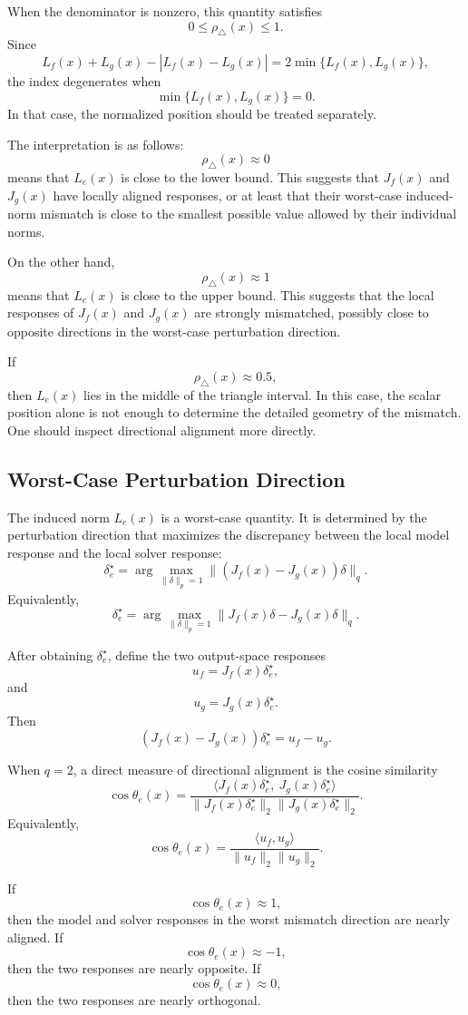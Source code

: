 \documentclass{article}
\begin{document}
When the denominator is nonzero, this quantity satisfies
\[
0\le \rho_{\triangle}(x)\le 1.
\]
Since
\[
L_f(x)+L_g(x)-|L_f(x)-L_g(x)|
=
2\min\{L_f(x),L_g(x)\},
\]
the index degenerates when
\[
\min\{L_f(x),L_g(x)\}=0.
\]
In that case, the normalized position should be treated separately.

The interpretation is as follows:
\[
\rho_{\triangle}(x)\approx 0
\]
means that \(L_e(x)\) is close to the lower bound. This suggests that \(J_f(x)\) and \(J_g(x)\) have locally aligned responses, or at least that their worst-case induced-norm mismatch is close to the smallest possible value allowed by their individual norms.

On the other hand,
\[
\rho_{\triangle}(x)\approx 1
\]
means that \(L_e(x)\) is close to the upper bound. This suggests that the local responses of \(J_f(x)\) and \(J_g(x)\) are strongly mismatched, possibly close to opposite directions in the worst-case perturbation direction.

If
\[
\rho_{\triangle}(x)\approx 0.5,
\]
then \(L_e(x)\) lies in the middle of the triangle interval. In this case, the scalar position alone is not enough to determine the detailed geometry of the mismatch. One should inspect directional alignment more directly.

\subsection{Worst-Case Perturbation Direction}

The induced norm \(L_e(x)\) is a worst-case quantity. It is determined by the perturbation direction that maximizes the discrepancy between the local model response and the local solver response:
\[
\delta_e^\star
=
\arg\max_{\|\delta\|_p=1}
\|(J_f(x)-J_g(x))\delta\|_q.
\]
Equivalently,
\[
\delta_e^\star
=
\arg\max_{\|\delta\|_p=1}
\|J_f(x)\delta-J_g(x)\delta\|_q.
\]

After obtaining \(\delta_e^\star\), define the two output-space responses
\[
u_f
=
J_f(x)\delta_e^\star,
\]
and
\[
u_g
=
J_g(x)\delta_e^\star.
\]
Then
\[
(J_f(x)-J_g(x))\delta_e^\star
=
u_f-u_g.
\]

When \(q=2\), a direct measure of directional alignment is the cosine similarity
\[
\cos\theta_e(x)
=
\frac{
\langle J_f(x)\delta_e^\star,\ J_g(x)\delta_e^\star\rangle
}{
\|J_f(x)\delta_e^\star\|_2
\|J_g(x)\delta_e^\star\|_2
}.
\]
Equivalently,
\[
\cos\theta_e(x)
=
\frac{
\langle u_f,u_g\rangle
}{
\|u_f\|_2\|u_g\|_2
}.
\]

If
\[
\cos\theta_e(x)\approx 1,
\]
then the model and solver responses in the worst mismatch direction are nearly aligned. If
\[
\cos\theta_e(x)\approx -1,
\]
then the two responses are nearly opposite. If
\[
\cos\theta_e(x)\approx 0,
\]
then the two responses are nearly orthogonal.
\end{document}
